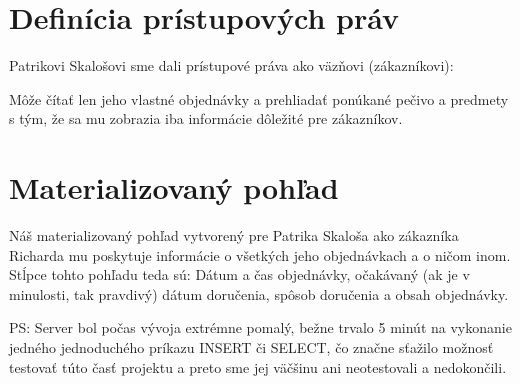\documentclass[a4paper]{article}
\begin{document}
  \section{Definícia prístupových práv}
  Patrikovi Skalošovi sme dali prístupové práva ako väzňovi (zákazníkovi):

  Môže čítať len jeho vlastné objednávky a prehliadať ponúkané pečivo a predmety
  s tým, že sa mu zobrazia iba informácie dôležité pre zákazníkov.


  \section{Materializovaný pohľad}
  Náš materializovaný pohľad vytvorený pre Patrika Skaloša ako zákazníka 
  Richarda mu poskytuje informácie o všetkých jeho objednávkach a o ničom inom.
  Stĺpce tohto pohľadu teda sú: Dátum a čas objednávky, očakávaný (ak je v
  minulosti, tak pravdivý) dátum doručenia, spôsob doručenia a obsah objednávky.


  \vspace{1in}

  PS: Server bol počas vývoja extrémne pomalý, bežne trvalo 5 minút na vykonanie
  jedného jednoduchého príkazu INSERT či SELECT, čo značne sťažilo možnosť
  testovať túto časť projektu a preto sme jej väčšinu ani neotestovali a
  nedokončili.
\end{document}

